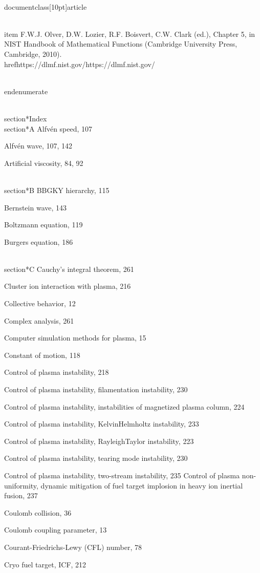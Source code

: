 \\documentclass[10pt]{article}
\begin{document}
{{{{{{  \\item F.W.J. Olver, D.W. Lozier, R.F. Boisvert, C.W. Clark (ed.), Chapter 5, in NIST Handbook of Mathematical Functions (Cambridge University Press, Cambridge, 2010). \\href{https://dlmf.nist.gov/}{https://dlmf.nist.gov/}

\\end{enumerate}

\\section*{Index}
\\section*{A}
Alfvén speed, 107

Alfvén wave, 107, 142

Artificial viscosity, 84, 92

\\section*{B}
BBGKY hierarchy, 115

Bernstein wave, 143

Boltzmann equation, 119

Burgers equation, 186

\\section*{C}
Cauchy's integral theorem, 261

Cluster ion interaction with plasma, 216

Collective behavior, 12

Complex analysis, 261

Computer simulation methods for plasma, 15

Constant of motion, 118

Control of plasma instability, 218

Control of plasma instability, filamentation instability, 230

Control of plasma instability, instabilities of magnetized plasma column, 224

Control of plasma instability, KelvinHelmholtz instability, 233

Control of plasma instability, RayleighTaylor instability, 223

Control of plasma instability, tearing mode instability, 230

Control of plasma instability, two-stream instability, 235
Control of plasma non-uniformity, dynamic mitigation of fuel target implosion in heavy ion inertial fusion, 237

Coulomb collision, 36

Coulomb coupling parameter, 13

Courant-Friedrichs-Lewy (CFL) number, 78

Cryo fuel target, ICF, 212

}}}}}}
\end{document}
